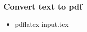 \documentclass{beamer}
\begin{document}
\note{
}
\begin{frame}
    \frametitle{Convert text to pdf}

    \begin{itemize}[<+->]
        \item{pdflatex input.tex}
    \end{itemize}

\end{frame}

\note{
}
\end{document}
